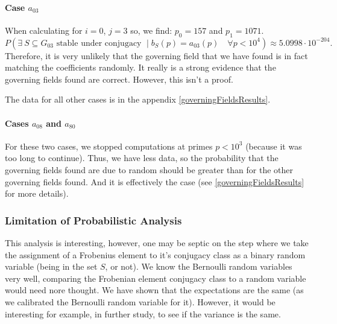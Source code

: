 \paragraph{Case $a_{03}$}
When calculating for $i=0$, $j=3$ so, we find:
$p_0 = 157$ and $p_1 = 1071$.
$$P(\exists \ S \subseteq G_{03} \text{ stable under conjugacy } \mid b_S(p) = a_{03}(p) \quad \forall p<10^4) \approx 5.0998 \cdot 10^{-204}.$$
Therefore, it is very unlikely that the governing field that we have found is in fact matching the coefficients randomly.
It really is a strong evidence that the governing fields found are correct.
However, this isn't a proof.

The data for all other cases is in the appendix \ref{governingFieldsResults}.

\paragraph{Cases $a_{08}$ and $a_{80}$}
For these two cases, we stopped computations at primes $p<10^3$ (because it was too long to continue).
Thus, we have less data, so the probability that the governing fields found are due to random should be greater than for the other governing fields found.
And it is effectively the case (see \ref{governingFieldsResults} for more details).


\subsubsection{Limitation of Probabilistic Analysis}
This analysis is interesting, however, one may be septic on the step where we take the assignment of a Frobenius element to it's conjugacy class as a binary random variable (being in the set $S$, or not).
We know the Bernoulli random variables very well, comparing the Frobenian element conjugacy class to a random variable would need nore thought.
We have shown that the expectations are the same (as we calibrated the Bernoulli random variable for it).
However, it would be interesting for example, in further study, to see if the variance is the same.
